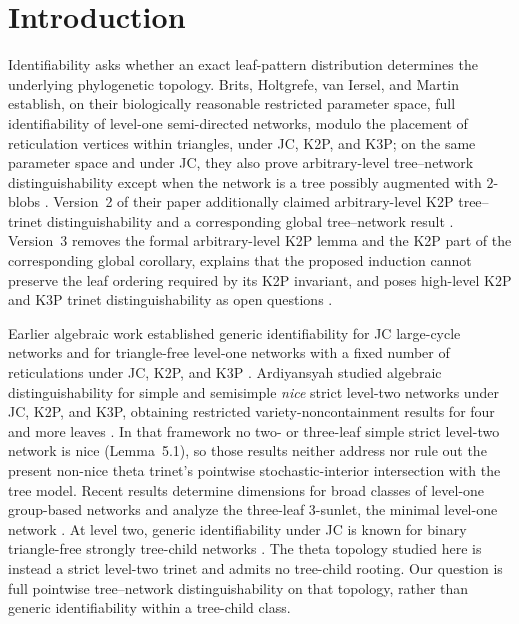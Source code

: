 \documentclass[11pt]{article}
\theoremstyle{remark}\newtheorem{remark}[theorem]{Remark}
\begin{document}
\section{Introduction}
Identifiability asks whether an exact leaf-pattern distribution determines the underlying phylogenetic topology. Brits, Holtgrefe, van Iersel, and Martin establish, on their biologically reasonable restricted parameter space, full identifiability of level-one semi-directed networks, modulo the placement of reticulation vertices within triangles, under JC, K2P, and K3P; on the same parameter space and under JC, they also prove arbitrary-level tree--network distinguishability except when the network is a tree possibly augmented with $2$-blobs \cite{BritsEtAl2026v3}. Version~2 of their paper additionally claimed arbitrary-level K2P tree--trinet distinguishability and a corresponding global tree--network result \cite{BritsEtAl2026v2}. Version~3 removes the formal arbitrary-level K2P lemma and the K2P part of the corresponding global corollary, explains that the proposed induction cannot preserve the leaf ordering required by its K2P invariant, and poses high-level K2P and K3P trinet distinguishability as open questions \cite{BritsEtAl2026v3}.

Earlier algebraic work established generic identifiability for JC large-cycle networks and for triangle-free level-one networks with a fixed number of reticulations under JC, K2P, and K3P \cite{GrossLong2018,GrossEtAl2021}. Ardiyansyah studied algebraic distinguishability for simple and semisimple \emph{nice} strict level-two networks under JC, K2P, and K3P, obtaining restricted variety-noncontainment results for four and more leaves \cite{Ardiyansyah2021}. In that framework no two- or three-leaf simple strict level-two network is nice (Lemma~5.1), so those results neither address nor rule out the present non-nice theta trinet's pointwise stochastic-interior intersection with the tree model. Recent results determine dimensions for broad classes of level-one group-based networks and analyze the three-leaf 3-sunlet, the minimal level-one network \cite{GrossKroneMartin2024,CoxGrossMartin2025}. At level two, generic identifiability under JC is known for binary triangle-free strongly tree-child networks \cite{EnglanderEtAl2025}. The theta topology studied here is instead a strict level-two trinet and admits no tree-child rooting. Our question is full pointwise tree--network distinguishability on that topology, rather than generic identifiability within a tree-child class.
\end{document}
